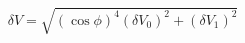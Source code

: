 \begin{equation}
\label{eq:delta_V_Malus}
\delta V = \sqrt{ \left(\cos{\phi}\right)^4(\delta V_0)^2 + (\delta V_1)^2}
\end{equation}